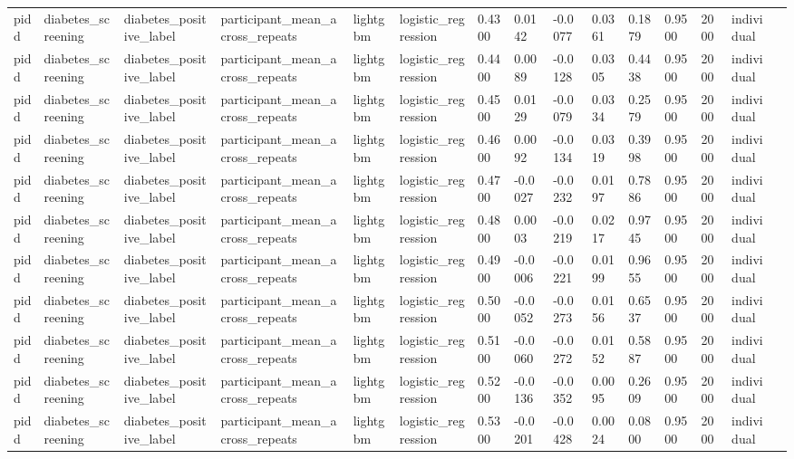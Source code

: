 \begin{tabular}{lllllllllllllll}
pidd & diabetes\_screening & diabetes\_positive\_label & participant\_mean\_across\_repeats & lightgbm & logistic\_regression & 0.4300 & 0.0142 & -0.0077 & 0.0361 & 0.1879 & 0.9500 & 2000 & individual &  \\
pidd & diabetes\_screening & diabetes\_positive\_label & participant\_mean\_across\_repeats & lightgbm & logistic\_regression & 0.4400 & 0.0089 & -0.0128 & 0.0305 & 0.4438 & 0.9500 & 2000 & individual &  \\
pidd & diabetes\_screening & diabetes\_positive\_label & participant\_mean\_across\_repeats & lightgbm & logistic\_regression & 0.4500 & 0.0129 & -0.0079 & 0.0334 & 0.2579 & 0.9500 & 2000 & individual &  \\
pidd & diabetes\_screening & diabetes\_positive\_label & participant\_mean\_across\_repeats & lightgbm & logistic\_regression & 0.4600 & 0.0092 & -0.0134 & 0.0319 & 0.3998 & 0.9500 & 2000 & individual &  \\
pidd & diabetes\_screening & diabetes\_positive\_label & participant\_mean\_across\_repeats & lightgbm & logistic\_regression & 0.4700 & -0.0027 & -0.0232 & 0.0197 & 0.7886 & 0.9500 & 2000 & individual &  \\
pidd & diabetes\_screening & diabetes\_positive\_label & participant\_mean\_across\_repeats & lightgbm & logistic\_regression & 0.4800 & 0.0003 & -0.0219 & 0.0217 & 0.9745 & 0.9500 & 2000 & individual &  \\
pidd & diabetes\_screening & diabetes\_positive\_label & participant\_mean\_across\_repeats & lightgbm & logistic\_regression & 0.4900 & -0.0006 & -0.0221 & 0.0199 & 0.9655 & 0.9500 & 2000 & individual &  \\
pidd & diabetes\_screening & diabetes\_positive\_label & participant\_mean\_across\_repeats & lightgbm & logistic\_regression & 0.5000 & -0.0052 & -0.0273 & 0.0156 & 0.6537 & 0.9500 & 2000 & individual &  \\
pidd & diabetes\_screening & diabetes\_positive\_label & participant\_mean\_across\_repeats & lightgbm & logistic\_regression & 0.5100 & -0.0060 & -0.0272 & 0.0152 & 0.5887 & 0.9500 & 2000 & individual &  \\
pidd & diabetes\_screening & diabetes\_positive\_label & participant\_mean\_across\_repeats & lightgbm & logistic\_regression & 0.5200 & -0.0136 & -0.0352 & 0.0095 & 0.2609 & 0.9500 & 2000 & individual &  \\
pidd & diabetes\_screening & diabetes\_positive\_label & participant\_mean\_across\_repeats & lightgbm & logistic\_regression & 0.5300 & -0.0201 & -0.0428 & 0.0024 & 0.0800 & 0.9500 & 2000 & individual &  \\

\end{tabular}
